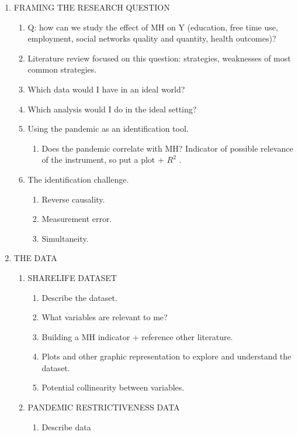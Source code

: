 \documentclass{article}
\begin{document}
\begin{enumerate}
    \item FRAMING THE RESEARCH QUESTION
    \begin{enumerate}
        \item Q: how can we study the effect of MH on Y (education, free time use, employment, social networks quality and quantity, health outcomes)?
        \item Literature review focused on this question: strategies, weaknesses of most common strategies.
        \item Which data would I have in an ideal world?
        \item Which analysis would I do in the ideal setting?
        \item Using the pandemic as an identification tool. 
            \begin{enumerate}
                \item Does the pandemic correlate with MH? Indicator of possible relevance of the instrument, so put a plot + $R^2$ .
            \end{enumerate}
        \item The identification challenge. 
            \begin{enumerate}
                \item Reverse causality.
                \item Measurement error. 
                \item Simultaneity.
            \end{enumerate}
    \end{enumerate}

    \item THE DATA
    \begin{enumerate}
        \item SHARELIFE DATASET 
        \begin{enumerate}
        \item Describe the dataset.
        \item What variables are relevant to me?
        \item Building a MH indicator + reference other literature.
        \item Plots and other graphic representation to explore and understand the dataset. 
        \item Potential collinearity between variables. 
        \end{enumerate}
        \item PANDEMIC RESTRICTIVENESS DATA
        \begin{enumerate}
            \item Describe data 
        \end{enumerate}
    \end{enumerate}
        


\end{enumerate}
\end{document}
